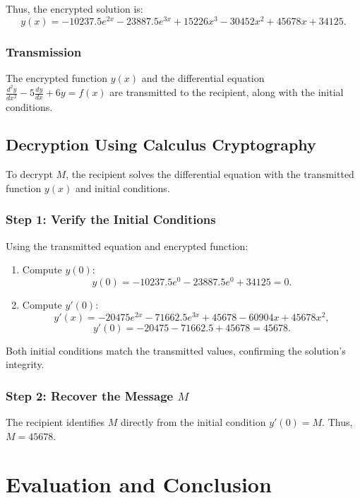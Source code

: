 \documentclass[12pt]{article}
\begin{document}
Thus, the encrypted solution is:
\[
y(x) = -10237.5e^{2x} - 23887.5e^{3x} + 15226x^3 - 30452x^2 + 45678x + 34125.
\]

\subsubsection*{Transmission}
The encrypted function \( y(x) \) and the differential equation \( \frac{d^2y}{dx^2} - 5\frac{dy}{dx} + 6y = f(x) \) are transmitted to the recipient, along with the initial conditions.

\subsection*{Decryption Using Calculus Cryptography}

To decrypt \( M \), the recipient solves the differential equation with the transmitted function \( y(x) \) and initial conditions.

\subsubsection*{Step 1: Verify the Initial Conditions}

Using the transmitted equation and encrypted function:
\begin{enumerate}
    \item Compute \( y(0) \):
    \[
    y(0) = -10237.5e^0 - 23887.5e^0 + 34125 = 0.
    \]

    \item Compute \( y'(0) \):
    \[
    y'(x) = -20475e^{2x} - 71662.5e^{3x} + 45678 - 60904x + 45678x^2,
    \]
    \[
    y'(0) = -20475 - 71662.5 + 45678 = 45678.
    \]
\end{enumerate}

Both initial conditions match the transmitted values, confirming the solution's integrity.

\subsubsection*{Step 2: Recover the Message \( M \)}
The recipient identifies \( M \) directly from the initial condition \( y'(0) = M \). Thus, \( M = 45678 \).





\section*{Evaluation and Conclusion}
\end{document}
